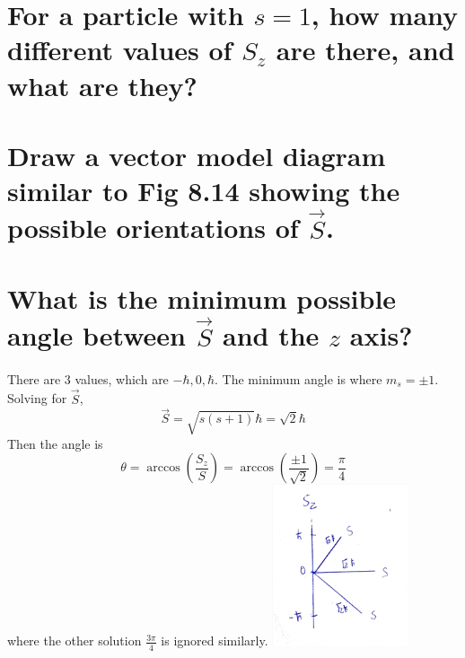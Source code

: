 \documentclass[answers]{exam}
\begin{document}
\begin{questions}
\begin{parts}
\part{For a particle with $s=1$, how many different values of $S_z$ are there, and what are they?}
\part{Draw a vector model diagram similar to Fig 8.14 showing the possible orientations of $\vec{S}$.}
\part{What is the minimum possible angle between $\vec{S}$ and the $z$ axis?}
\end{parts}

\begin{solution}
	There are 3 values, which are $-\hbar,0,\hbar$. The minimum angle is where $m_s = \pm1$. Solving for $\vec{S}$,
	$$\vec{S} = \sqrt{s(s+1)}\hbar = \sqrt{2}\hbar$$
	Then the angle is
	$$\theta = \arccos\left(\frac{S_z}{S}\right) = \arccos\left(\frac{\pm1}{\sqrt{2}}\right) = \frac{\pi}{4}$$
	where the other solution $\frac{3\pi}{4}$ is ignored similarly.
	\includegraphics[width=0.3\textwidth]{q2.pdf}
\end{solution}



\end{questions}
\end{document}
